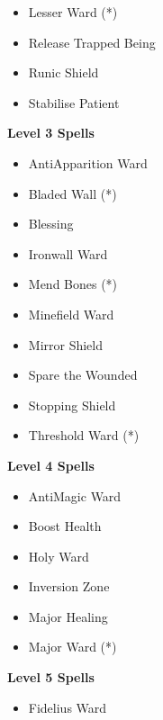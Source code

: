 \begin{multicols}{4}
{\begin{itemize}[itemsep=0em]
\item Lesser Ward (*) 

\item Release Trapped Being

\item Runic Shield

\item Stabilise Patient


\end{itemize}
\textbf{Level 3 Spells}
\begin{itemize}[itemsep=0em]
\renewcommand\labelitemi{-}
\item Anti\minus{}Apparition Ward

\item Bladed Wall (*) 

\item Blessing

\item Ironwall Ward

\item Mend Bones (*) 

\item Minefield Ward

\item Mirror Shield

\item Spare the Wounded

\item Stopping Shield

\item Threshold Ward (*) 


\end{itemize}
\textbf{Level 4 Spells}
\begin{itemize}[itemsep=0em]
\renewcommand\labelitemi{-}
\item Anti\minus{}Magic Ward

\item Boost Health

\item Holy Ward

\item Inversion Zone

\item Major Healing

\item Major Ward (*) 


\end{itemize}
\textbf{Level 5 Spells}
\begin{itemize}[itemsep=0em]
\renewcommand\labelitemi{-}
\item Fidelius Ward


\end{itemize}}
\end{multicols}
